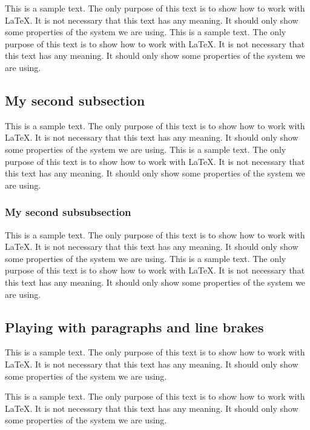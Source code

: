 \documentclass[10pt, paper=a4, abstracton]{scrartcl}
\begin{document}
This is a sample text. The only purpose of this text is to show how to work with \LaTeX . It is not necessary that this text has any meaning. It should only show some properties of the system we are using. This is a sample text. The only purpose of this text is to show how to work with \LaTeX . It is not necessary that this text has any meaning. It should only show some properties of the system we are using. 


\subsection[Second subsection]{My second subsection}

This is a sample text. The only purpose of this text is to show how to work with \LaTeX . It is not necessary that this text has any meaning. It should only show some properties of the system we are using. This is a sample text. The only purpose of this text is to show how to work with \LaTeX . It is not necessary that this text has any meaning. It should only show some properties of the system we are using. 


\subsubsection[Second subsubsection]{My second subsubsection}

This is a sample text. The only purpose of this text is to show how to work with \LaTeX . It is not necessary that this text has any meaning. It should only show some properties of the system we are using. This is a sample text. The only purpose of this text is to show how to work with \LaTeX . It is not necessary that this text has any meaning. It should only show some properties of the system we are using. 


\subsection[Paragraphs and line brakes]{Playing with paragraphs and line brakes}

This is a sample text. The only purpose of this text is to show how to work with \LaTeX . It is not necessary that this text has any meaning. It should only show some properties of the system we are using. \par 

This is a sample text. The only purpose of this text is to show how to work with \LaTeX . It is not necessary that this text has any meaning. It should only show some properties of the system we are using. 
\end{document}
